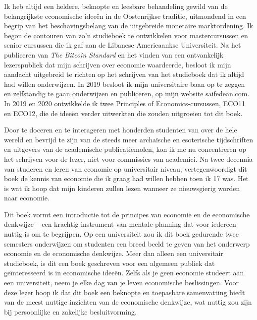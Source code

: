 Ik heb altijd een heldere, beknopte en leesbare behandeling gewild van de belangrijkste economische ideeën in de Oostenrijkse traditie, uitmondend in een begrip van het beschavingsbelang van de uitgebreide monetaire marktordening. Ik begon de contouren van zo'n studieboek te ontwikkelen voor mastercursussen en senior cursussen die ik gaf aan de Libanese Americaankse Universiteit. Na het publiceren van \textit{The Bitcoin Standard} en het vinden van een ontvankelijk lezerspubliek dat mijn schrijven over economie waardeerde, besloot ik mijn aandacht uitgebreid te richten op het schrijven van het studieboek dat ik altijd had willen onderwijzen. In 2019 besloot ik mijn universitaire baan op te zeggen en zelfstandig te gaan onderwijzen en publiceren, op mijn website saifedean.com. In 2019 en 2020 ontwikkelde ik twee Principles of Economics-cursussen, ECO11 en ECO12, die de ideeën verder uitwerkten die zouden uitgroeien tot dit boek.

Door te doceren en te interageren met honderden studenten van over de hele wereld en bevrijd te zijn van de steeds meer archaïsche en esoterische tijdschriften en uitgevers van de academische publicatiemolen, kon ik me nu concentreren op het schrijven voor de lezer, niet voor commissies van academici. Na twee decennia van studeren en leren van economie op universitair niveau, vertegenwoordigt dit boek de kennis van economie die ik graag had willen hebben toen ik 17 was. Het is wat ik hoop dat mijn kinderen zullen lezen wanneer ze nieuwsgierig worden naar economie.

Dit boek vormt een introductie tot de principes van economie en de economische denkwijze -- een krachtig instrument van mentale planning dat voor iedereen nuttig is om te begrijpen. Op een universiteit zou ik dit boek gedurende twee semesters onderwijzen om studenten een breed beeld te geven van het onderwerp economie en de economische denkwijze. Meer dan alleen een universitair studieboek, is dit een boek geschreven voor een algemeen publiek dat geïnteresseerd is in economische ideeën. Zelfs als je geen economie studeert aan een universiteit, neem je elke dag van je leven economische beslissingen. Voor deze lezer hoop ik dat dit boek een beknopte en toepasbare samenvatting biedt van de meest nuttige inzichten van de economische denkwijze, wat nuttig zou zijn bij persoonlijke en zakelijke besluitvorming.

